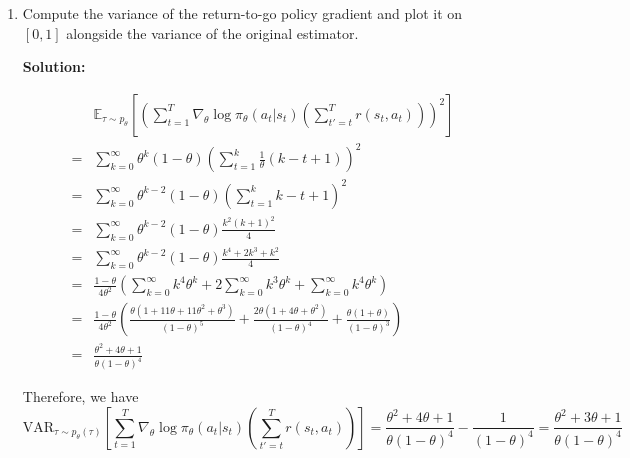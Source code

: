 \documentclass{article}
\begin{document}
\begin{enumerate}
\begin{enumerate}
Note that the terms in the parentheses are the second and first moments of a geometric distribution, so we have

\[
\sum_{k=0}^{\infty}k^2\theta^k(1-\theta) = \frac{\theta + \theta^2}{(1-\theta)^2}
\]

and
\[
\sum_{k=0}^{\infty}k\theta^k(1-\theta) = \frac{\theta}{1-\theta}
\]

Plugging them back in, we get
\begin{align}
\nabla_{\theta}J(\theta) &= \frac{1}{2\theta}(\sum_{k=0}^{\infty}k^2\theta^k(1-\theta) + \sum_{k=0}^{\infty}k\theta^k(1-\theta)) \\
&= \frac{1}{2\theta}(\frac{\theta + \theta^2}{(1-\theta)^2} + \frac{\theta}{1-\theta}) \\
&= \frac{1}{(1-\theta)^2}
\end{align}

    \item Compute the variance of the return-to-go policy gradient and plot it on $[0, 1]$ alongside the variance of the original estimator.

\textbf{Solution:}

\begin{align}
&\mathbb{E}_{\tau \sim p_\theta}[(\sum_{t=1}^{T}\nabla_\theta \log \pi_\theta(a_t | s_t)(\sum_{t'=t}^{T}r(s_t, a_t)))^2] \\
=& \sum_{k=0}^{\infty}\theta^k(1-\theta)(\sum_{t=1}^{k}\frac{1}{\theta}(k - t + 1))^2 \\
=& \sum_{k=0}^{\infty}\theta^{k-2}(1-\theta)(\sum_{t=1}^{k}k - t + 1)^2 \\
=& \sum_{k=0}^{\infty}\theta^{k-2}(1-\theta)\frac{k^2(k+1)^2}{4} \\
=& \sum_{k=0}^{\infty}\theta^{k-2}(1-\theta)\frac{k^4+2k^3+k^2}{4} \\
=& \frac{1-\theta}{4\theta^2}(\sum_{k=0}^{\infty}k^4\theta^k + 2\sum_{k=0}^{\infty}k^3\theta^k + \sum_{k=0}^{\infty}k^4\theta^k) \\
=& \frac{1-\theta}{4\theta^2}(\frac{\theta(1 + 11\theta + 11\theta^2 + \theta^3)}{(1-\theta)^5} + \frac{2\theta(1 + 4\theta + \theta^2)}{(1-\theta)^4} + \frac{\theta(1+\theta)}{(1-\theta)^3}) \\
=& \frac{\theta^2 + 4\theta + 1}{\theta(1-\theta)^4}
\end{align}

Therefore, we have
\[
\text{VAR}_{\tau \sim p_\theta(\tau)}[\sum_{t=1}^{T}\nabla_\theta \log \pi_\theta(a_t | s_t)(\sum_{t'=t}^{T}r(s_t, a_t))] = \frac{\theta^2 + 4\theta + 1}{\theta(1-\theta)^4} - \frac{1}{(1-\theta)^4} = \frac{\theta^2 + 3\theta + 1}{\theta(1-\theta)^4}
\]


\end{enumerate}
\end{enumerate}
\end{document}
